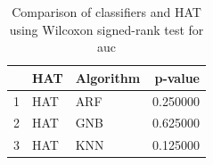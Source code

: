 \begin{table}
\footnotesize
\caption{Comparison of classifiers and HAT using Wilcoxon signed-rank test for auc}
\label{tab:HAT wilcoxon AUC comparison}
\begin{tabular}{lllr}
\hline
 & HAT & Algorithm & p-value \\
\hline
1 & HAT & ARF & 0.250000 \\
2 & HAT & GNB & 0.625000 \\
3 & HAT & KNN & 0.125000 \\
\hline
\end{tabular}
\end{table}

